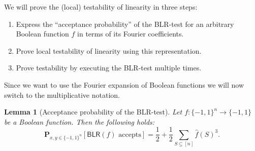 \documentclass[a4paper]{article}
\newcommand{\prob}{\mathbf{P}}
\newcommand{\nset}{[n]}
\theoremstyle{plain}
\newtheorem{lemma}{Lemma}
\theoremstyle{definition}
\begin{document}
We will prove the (local) testability of linearity in three steps: 
\begin{enumerate}
\item Express the ``acceptance probability'' of the \textsf{BLR}-test
  for an arbitrary Boolean function \(f\) in terms of its Fourier
  coefficients.
\item Prove local testability of linearity using this representation.
\item Prove testability by executing the \textsf{BLR}-test multiple
  times. 
\end{enumerate}

\noindent Since we want to use the Fourier expansion of Boolean
functions we will now switch to the multiplicative notation. 

\begin{lemma}[Acceptance probability of the \textsf{BLR}-test] \label{lem:1}
  Let \(f: \{-1,1\}^n \rightarrow \{-1,1\}\) be a Boolean function. Then
  the following holds: 
  \begin{equation}
    \label{eq:2}
    \prob_{x,y \in \{-1,1\}^n}[\textsf{BLR}(f) \text{ accepts}] = \frac{1}{2} + \frac{1}{2}\sum_{S\subseteq \nset}\hat{f}(S)^3.
  \end{equation}
\end{lemma}
\end{document}
